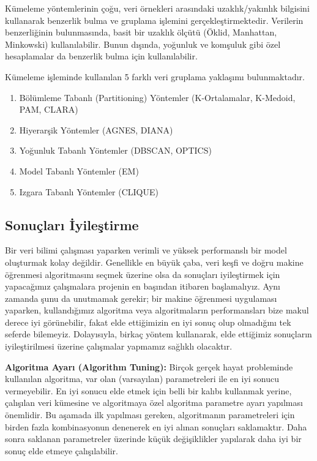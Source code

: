 \documentclass[12pt,twoside]{deuthesis}
\providecommand{\tightlist}{%
  \setlength{\itemsep}{0pt}\setlength{\parskip}{0pt}}
\begin{document}
Kümeleme yöntemlerinin çoğu, veri örnekleri arasındaki uzaklık/yakınlık bilgisini kullanarak benzerlik bulma ve gruplama işlemini gerçekleştirmektedir. Verilerin benzerliğinin bulunmasında, basit bir uzaklık ölçütü (Öklid, Manhattan, Minkowski) kullanılabilir. Bunun dışında, yoğunluk ve komşuluk gibi özel hesaplamalar da benzerlik bulma için kullanılabilir.

Kümeleme işleminde kullanılan 5 farklı veri gruplama yaklaşımı bulunmaktadır.
\begin{enumerate}
\def\labelenumi{\arabic{enumi}.}
\tightlist
\item
  Bölümleme Tabanlı (Partitioning) Yöntemler (K-Ortalamalar, K-Medoid, PAM, CLARA)
\item
  Hiyerarşik Yöntemler (AGNES, DIANA)
\item
  Yoğunluk Tabanlı Yöntemler (DBSCAN, OPTICS)
\item
  Model Tabanlı Yöntemler (EM)
\item
  Izgara Tabanlı Yöntemler (CLIQUE)
\end{enumerate}
\hypertarget{sonuuxe7larux131-iux307yileux15ftirme}{%
\subsection{Sonuçları İyileştirme}\label{sonuuxe7larux131-iux307yileux15ftirme}}

Bir veri bilimi çalışması yaparken verimli ve yüksek performanslı bir model oluşturmak kolay değildir. Genellikle en büyük çaba, veri keşfi ve doğru makine öğrenmesi algoritmasını seçmek üzerine olsa da sonuçları iyileştirmek için yapacağımız çalışmalara projenin en başından itibaren başlamalıyız. Aynı zamanda şunu da unutmamak gerekir; bir makine öğrenmesi uygulaması yaparken, kullandığımız algoritma veya algoritmaların performansları bize makul derece iyi görünebilir, fakat elde ettiğimizin en iyi sonuç olup olmadığını tek seferde bilemeyiz. Dolayısıyla, birkaç yöntem kullanarak, elde ettiğimiz sonuçların iyileştirilmesi üzerine çalışmalar yapmamız sağlıklı olacaktır.

\textbf{Algoritma Ayarı (Algorithm Tuning):} Birçok gerçek hayat probleminde kullanılan algoritma, var olan (varsayılan) parametreleri ile en iyi sonucu vermeyebilir. En iyi sonucu elde etmek için belli bir kalıbı kullanmak yerine, çalışılan veri kümesine ve algoritmaya özel algoritma parametre ayarı yapılması önemlidir. Bu aşamada ilk yapılması gereken, algoritmanın parametreleri için birden fazla kombinasyonun denenerek en iyi alınan sonuçları saklamaktır. Daha sonra saklanan parametreler üzerinde küçük değişiklikler yapılarak daha iyi bir sonuç elde etmeye çalışılabilir.
\end{document}
